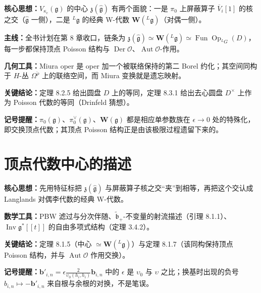 \begin{keypoints}
    \item \textbf{核心思想：}$V_{\kappa_c}(\mathfrak g)$ 的中心 $\mathfrak z(\hat{\mathfrak g})$ 有两个面貌：一是 $\pi_0$ 上屏蔽算子 $\overline V_i[1]$ 的核之交（$\hat{\mathfrak g}$ 一侧），二是 ${}^L\mathfrak g$ 的经典 W-代数 $\mathbf W({}^L\mathfrak g)$（对偶一侧）。
    \item \textbf{主线：}全书计划在第 8 章收口，链条为 $\mathfrak z(\hat{\mathfrak g})\simeq\mathbf W({}^L\mathfrak g)\simeq\operatorname{Fun}\operatorname{Op}_{{}^LG}(D)$，每一步都保持顶点 Poisson 结构与 $\operatorname{Der}\mathcal O$、$\operatorname{Aut}\mathcal O$-作用。
    \item \textbf{几何工具：}Miura oper 是 oper 加一个被联络保持的第二 Borel 约化；其空间同构于 $H$-丛 $\Omega^{\check\rho}$ 上的联络空间，而 Miura 变换就是遗忘映射。
    \item \textbf{关键结论：}定理 8.2.5 给出圆盘 $D$ 上的等同，定理 8.3.1 给出去心圆盘 $D^\times$ 上作为 Poisson 代数的等同（Drinfeld 猜想）。
    \item \textbf{记号提醒：}$\pi_0(\mathfrak g)$、$\pi^\vee_0(\mathfrak g)$、$\mathbf W(\mathfrak g)$ 都是相应单参数族在 $\epsilon\to0$ 处的特殊化，即交换顶点代数；其顶点 Poisson 结构正是由该极限过程遗留下来的。
\end{keypoints}


\section{顶点代数中心的描述}

\begin{keypoints}
    \item \textbf{核心思想：}先用特征标把 $\mathfrak z(\hat{\mathfrak g})$ 与屏蔽算子核之交“夹”到相等，再把这个交认成 Langlands 对偶李代数的经典 W-代数。
    \item \textbf{数学工具：}PBW 滤过与分次伴随、$\tilde{\mathfrak b}_+$-不变量的射流描述（引理 8.1.1）、$\operatorname{Inv}\mathfrak g^*[\![t]\!]$ 的自由多项式结构（定理 3.4.2）。
    \item \textbf{关键结论：}定理 8.1.5（中心 $\simeq\mathbf W({}^L\mathfrak g)$）与定理 8.1.7（该同构保持顶点 Poisson 结构，并与 $\operatorname{Aut}\mathcal O$ 作用交换）。
    \item \textbf{记号提醒：}$\mathbf b'_{i,n}=\epsilon\frac{2}{\upsilon_0(h_i,h_i)}\mathbf b_{i,n}$ 中的 $\epsilon$ 是 $\upsilon_0$ 与 $\upsilon$ 之比；换基时出现的负号 $b_{i,n}\mapsto-\mathbf b'_{i,n}$ 来自根与余根的对换，不是笔误。
\end{keypoints}

